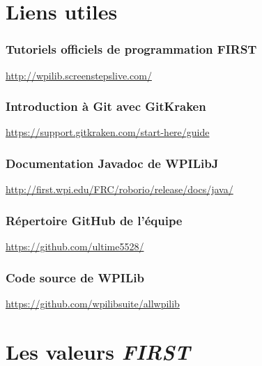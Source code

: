 \documentclass[12pt]{report}
\begin{document}
{\hypersetup{hidelinks}
%
\clearpage
{}
\setcounter{page}{1}

\tableofcontents

\newpage
%
\newpage
%
\listoffigures
{}
\newpage
%

\chapter*{Liens utiles}
%

\subsection*{Tutoriels officiels de programmation FIRST}
\url{http://wpilib.screenstepslive.com/}

\subsection*{Introduction à Git avec GitKraken}
\url{https://support.gitkraken.com/start-here/guide}

\subsection*{Documentation Javadoc de WPILibJ}
\url{http://first.wpi.edu/FRC/roborio/release/docs/java/}

\subsection*{Répertoire GitHub de l'équipe}
\url{https://github.com/ultime5528/}

\subsection*{Code source de WPILib}
\url{https://github.com/wpilibsuite/allwpilib}

} %

\chapter*{Les valeurs \textit{FIRST}}
\end{document}
